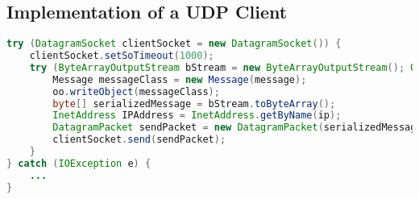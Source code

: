 \subsection{Implementation of a UDP Client}
\begin{minipage}{\linewidth}
	\begin{lstlisting}[language=Java, caption={Interface prescribes a sendMessage method},captionpos=b,label=lst:sendUDPMessage]
try (DatagramSocket clientSocket = new DatagramSocket()) {
	clientSocket.setSoTimeout(1000);
	try (ByteArrayOutputStream bStream = new ByteArrayOutputStream(); ObjectOutput oo = new ObjectOutputStream(bStream)) {
		Message messageClass = new Message(message);
		oo.writeObject(messageClass);
		byte[] serializedMessage = bStream.toByteArray();
		InetAddress IPAddress = InetAddress.getByName(ip);
		DatagramPacket sendPacket = new DatagramPacket(serializedMessage, serializedMessage.length, IPAddress, port);
		clientSocket.send(sendPacket);
	}
} catch (IOException e) {
	...
}
	\end{lstlisting}
\end{minipage}